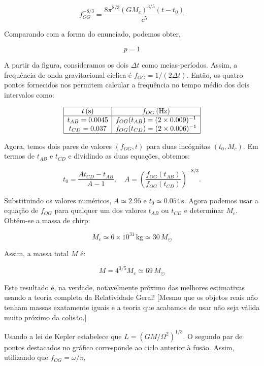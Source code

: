 \documentclass[11pt]{article}
\begin{document}
\begin{pproblem}
\begin{pssolution*}{}{}
\begin{alternativas}
        \[f_{OG}^{-8/3} = \frac{8\pi^{8/3}(GM_c)^{3/5}(t-t_0)}{c^5}\]

        Comparando com a forma do enunciado, podemos obter, 

        \[\boxed{p = 1}\]

        \item  A partir da figura, consideramos os dois $\Delta t$ como meias-períodos. Assim, a frequência de onda gravitacional cíclica é $f_{OG} = 1/(2 \Delta t)$. Então, os quatro pontos fornecidos nos permitem calcular a frequência no tempo médio dos dois intervalos como:

        \[
        \begin{array}{|c|c|}
        \hline
        t \, (\text{s}) & f_{OG} \, (\text{Hz}) \\
        \hline
        t_{AB} = 0.0045 & f_{OG}(t_{AB}) = (2 \times 0.009)^{-1} \\
        t_{CD} = 0.037 & f_{OG}(t_{CD}) = (2 \times 0.006)^{-1} \\
        \hline
        \end{array}
        \]
        
        Agora, temos dois pares de valores $(f_{OG}, t)$ para duas incógnitas $(t_0, M_c)$. Em termos de $t_{AB}$ e $t_{CD}$ e dividindo as duas equações, obtemos:
        
        \[
        t_0 = \frac{A t_{CD} - t_{AB}}{A - 1}, \quad A = \left( \frac{f_{OG}(t_{AB})}{f_{OG}(t_{CD})} \right)^{-8/3}.
        \]
        
        Substituindo os valores numéricos, $A \simeq 2.95$ e $t_0 \simeq 0.054 \, \text{s}$. Agora podemos usar a equação de \(f_{OG}\) para qualquer um dos valores $t_{AB}$ ou $t_{CD}$ e determinar $M_c$. Obtém-se a massa de chirp:
        
        \[
        M_c \simeq 6 \times 10^{31} \, \text{kg} \simeq 30 \, M_\odot\]
        
        Assim, a massa total $M$ é:
        
        \[
        M = 4^{3/5} M_c \simeq 69 \, M_\odot
        \]
        
        Este resultado é, na verdade, notavelmente próximo das melhores estimativas usando a teoria completa da Relatividade Geral! [Mesmo que os objetos reais não tenham massas exatamente iguais e a teoria que acabamos de usar não seja válida muito próximo da colisão.]
    
        \item Usando a lei de Kepler estabelece que $L = (GM / \Omega^2)^{1/3}$. O segundo par de pontos destacados no gráfico corresponde ao ciclo anterior à fusão. Assim, utilizando que \(f_{OG} = \omega/\pi\), 


\end{alternativas}
\end{pssolution*}
\end{pproblem}
\end{document}
